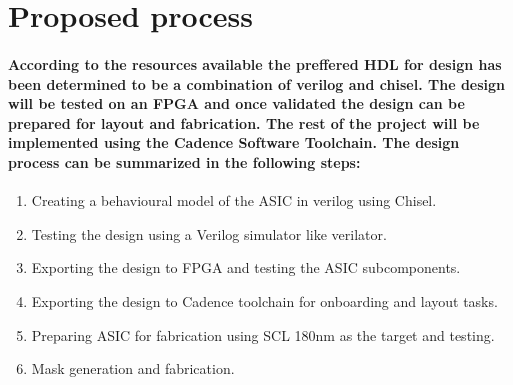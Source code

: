 \documentclass[12pt,a4paper]{report}
\begin{document}
\section{Proposed process}
\paragraph{\textrm{\textmd{According to the resources available the preffered HDL for design has been determined to be a combination of verilog and chisel. The design will be tested on an FPGA and once validated the design can be prepared for layout and fabrication. The rest of the project will be implemented using the Cadence Software Toolchain. The design process can be summarized in the following steps:}}}
\begin{enumerate}
	\item Creating a behavioural model of the ASIC in verilog using Chisel.
	\item Testing the design using a Verilog simulator like verilator.
	\item Exporting the design to FPGA and testing the ASIC subcomponents.
	\item Exporting the design to Cadence toolchain for onboarding and layout tasks.
	\item Preparing ASIC for fabrication using SCL 180nm as the target and testing.
	\item Mask generation and fabrication.
\end{enumerate}

\end{document}
